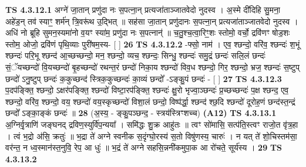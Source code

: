 \documentclass[17pt]{extarticle}
\begin{document}
                                        \textbf{ TS 4.3.12.1} \newline
                  अग्ने॑ जा॒तान् प्रणु॑दा नः स॒पत्ना॒न् प्रत्यजा॑ताञ्जातवेदो नुदस्व । अ॒स्मे दी॑दिहि सु॒मना॒ अहे॑ड॒न् तव॑ स्याꣳ॒॒ शर्म॑न् त्रि॒वरू॑थ उ॒द्भित् ॥ सह॑सा जा॒तान् प्रणु॑दानः स॒पत्ना॒न् प्रत्यजा॑ताञ्जातवेदो नुदस्व । अधि॑ नो ब्रूहि सुमन॒स्यमा॑नो व॒यꣳ स्या॑म॒ प्रणु॑दा नः स॒पत्नान्॑ ॥ च॒तु॒श्च॒त्वा॒रिꣳ॒॒शः स्तोमो॒ वर्चो॒ द्रवि॑णꣳ षोड॒शः स्तोम॒ ओजो॒ द्रवि॑णं पृथि॒व्याः पुरी॑षम॒स्य- [  ] \textbf{  26} \newline
                  \newline
                                \textbf{ TS 4.3.12.2} \newline
                  -फ्सो॒ नाम॑ । एव॒ श्छन्दो॒ वरि॑व॒ श्छन्दः॑ श॒भूं श्छन्दः॑ परि॒भू श्छन्द॑ आ॒च्छच्छन्दो॒ मन॒ श्छन्दो॒ व्यच॒ श्छन्दः॒ सिन्धु॒ श्छन्दः॑ समु॒द्रं छन्दः॑ सलि॒लं छन्दः॑ सं॒ॅयच्छन्दो॑ वि॒यच्छन्दो॑ बृ॒हच्छन्दो॑ रथन्त॒रं छन्दो॑ निका॒य श्छन्दो॑ विव॒ध श्छन्दो॒ गिर॒ श्छन्दो॒ भ्रज॒ श्छन्दः॑ स॒ष्टुप् छन्दो॑ ऽनु॒ष्टुप् छन्दः॑ क॒कुच्छन्द॑ स्त्रिक॒कुच्छन्दः॑ का॒व्यं छन्दो᳚ -ऽङ्कु॒पं छन्दः॑ - [  ] \textbf{  27} \newline
                  \newline
                                \textbf{ TS 4.3.12.3} \newline
                  प॒दप॑ङ्क्ति॒ श्छन्दो॒ ऽक्षर॑पङ्क्ति॒ श्छन्दो॑ विष्टा॒रप॑ङ्क्ति॒ श्छन्दः॑ क्षु॒रो भृज्वा॒ञ्छन्दः॑ प्र॒च्छच्छन्दः॑ प॒क्ष श्छन्द॒ एव॒ श्छन्दो॒ वरि॑व॒ श्छन्दो॒ वय॒ श्छन्दो॑ वय॒स्कृच्छन्दो॑ विशा॒लं छन्दो॒ विष्प॑र्द्धा॒ श्छन्द॑ श्छ॒दि श्छन्दो॑ दूरोह॒णं छन्द॑स्त॒न्द्रं छन्दो᳚ ऽङ्का॒ङ्कं छन्दः॑ ॥ \textbf{  28 } \newline
                  \newline
                      (अ॒स्य॒ - ङ्कु॒पञ्छन्द॒ - स्त्रय॑स्त्रिꣳशच्च)  \textbf{(A12)} \newline \newline
                                        \textbf{ TS 4.3.13.1} \newline
                  अ॒ग्निर्वृ॒त्राणि॑ जङ्घनद् द्रविण॒स्युर्वि॑प॒न्यया᳚ । समि॑द्धः शु॒क्र आहु॑तः ॥ त्वꣳ सो॑मासि॒ सत्प॑ति॒स्त्वꣳ राजो॒त वृ॑त्र॒हा । त्वं भ॒द्रो अ॑सि॒ क्रतुः॑ ॥ भ॒द्रा ते॑ अग्ने स्वनीक स॒दृंग्घो॒रस्य॑ स॒तो विषु॑णस्य॒ चारुः॑ । न यत् ते॑ शो॒चिस्तम॑सा॒ वर॑न्त॒ न ध्व॒स्मान॑स्त॒नुवि॒ रेप॒ आ धुः॑ ॥ भ॒द्रं ते॑ अग्ने सहसि॒न्ननी॑कमुपा॒क आ रो॑चते॒ सूर्य॑स्य । \textbf{  29} \newline
                  \newline
                                \textbf{ TS 4.3.13.2} \newline
\end{document}
